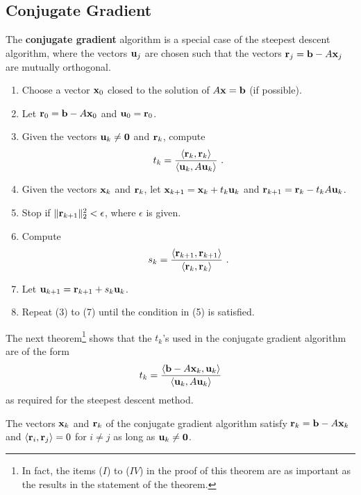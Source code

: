 \subsection{Conjugate Gradient}

The {\bfseries conjugate gradient} algorithm
is a special case of the steepest descent algorithm, where the vectors
$\mathbf{u}_j$ are chosen such that the vectors
$\mathbf{r}_j = \mathbf{b} - A\mathbf{x}_j$ are mutually orthogonal.

\begin{algo}
\begin{enumerate}
\item Choose a vector $\mathbf{x}_{0}$ closed to the solution of
$A \mathbf{x} = \mathbf{b}$ (if possible).
\item Let $\mathbf{r}_0 = \mathbf{b}-A\mathbf{x}_0$ and $\mathbf{u}_0 = \mathbf{r}_0$.
\item Given the vectors $\mathbf{u}_k \neq \mathbf{0}$ and
$\mathbf{r}_k$, compute
\[
t_k =
\frac{\ps{\VEC{r}_k}{\VEC{r}_k}}{\ps{\VEC{u}_k}{A\VEC{u}_k}} \ .
\]
\item Given the vectors $\mathbf{x}_k$ and $\mathbf{r}_k$, let
$\mathbf{x}_{k+1} = \mathbf{x}_k + t_k \mathbf{u}_k$ 
and $\mathbf{r}_{k+1} = \mathbf{r}_k - t_k A \mathbf{u}_k$.
\item Stop if
$\| \mathbf{r}_{k+1} \|_2^2 < \epsilon$, where $\epsilon$ is given.
\item Compute
\[
s_k =
\frac{\ps{\VEC{r}_{k+1}}{\VEC{r}_{k+1}}}{\ps{\VEC{r}_k}{\VEC{r}_k}} \ .
\]
\item Let $\mathbf{u}_{k+1} = \mathbf{r}_{k+1} + s_k \mathbf{u}_k$.
\item Repeat (3) to (7) until the condition in (5) is satisfied.
\end{enumerate}
\label{ConjGradAlgo}
\end{algo}

The next theorem\footnote{In fact, the items ($I$) to ($IV$) in the
proof of this theorem are as important as the results in the statement
of the theorem.} shows that the $t_k$'s used in the conjugate gradient
algorithm are of the form
\[
t_k = \frac{\left\langle{\mathbf{b}-A\mathbf{x}_k} , {\mathbf{u}_k}\right\rangle}
{\left\langle{\mathbf{u}_k} , {A\mathbf{u}_k}\right\rangle}
\]
as required for the steepest descent method.

\begin{theorem}
The vectors $\mathbf{x}_k$ and $\mathbf{r}_k$ of the conjugate
gradient algorithm satisfy $\mathbf{r}_k = \mathbf{b}-A\mathbf{x}_k$ and
$\left\langle{\mathbf{r}_i} , {\mathbf{r}_j}\right\rangle = 0$ for $i\neq j$ as long as
$\mathbf{u}_k \neq \mathbf{0}$.
\end{theorem}

